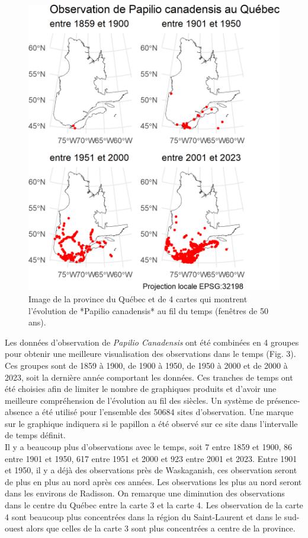 \documentclass[9pt,twocolumn,twoside,]{pnas-new}
\begin{document}
\begin{figure}

\includegraphics[width=1\linewidth]{cartes_pcanadensis} \hfill{}

\caption{Image de la province du Québec et de 4 cartes qui montrent l'évolution de *Papilio canadensis* au fil du temps (fenêtres de 50 ans).}\label{fig:fig_cartes_pcanadensis, fullpage-figure}
\end{figure}

Les données d'observation de \emph{Papilio Canadensis} ont été combinées
en 4 groupes pour obtenir une meilleure visualisation des observations
dans le temps (Fig. 3). Ces groupes sont de 1859 à 1900, de 1900 à 1950,
de 1950 à 2000 et de 2000 à 2023, soit la dernière année comportant les
données. Ces tranches de temps ont été choisies afin de limiter le
nombre de graphiques produits et d'avoir une meilleure compréhension de
l'évolution au fil des siècles. Un système de présence-absence a été
utilisé pour l'ensemble des 50684 sites d'observation. Une marque sur le
graphique indiquera si le papillon a été observé sur ce site dans
l'intervalle de temps définit.\\
Il y a beaucoup plus d'observations avec le temps, soit 7 entre 1859 et
1900, 86 entre 1901 et 1950, 617 entre 1951 et 2000 et 923 entre 2001 et
2023. Entre 1901 et 1950, il y a déjà des observations près de
Waskaganish, ces observation seront de plus en plus au nord après ces
années. Les observations les plus au nord seront dans les environs de
Radisson. On remarque une diminution des observations dans le centre du
Québec entre la carte 3 et la carte 4. Les observation de la carte 4
sont beaucoup plus concentrées dans la région du Saint-Laurent et dans
le sud-ouest alors que celles de la carte 3 sont plus concentrées a
centre de la province.
\end{document}
